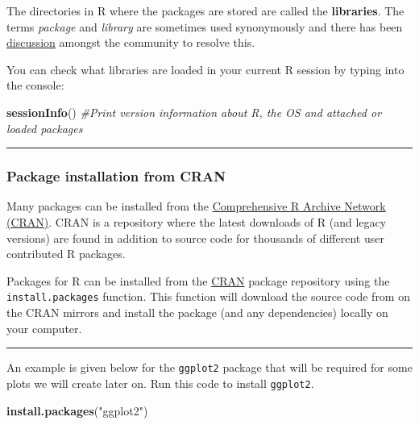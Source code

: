 \documentclass[
]{article}
\newenvironment{Shaded}{\begin{snugshade}}{\end{snugshade}}
\newcommand{\CommentTok}[1]{\textcolor[rgb]{0.56,0.35,0.01}{\textit{#1}}}
\newcommand{\KeywordTok}[1]{\textcolor[rgb]{0.13,0.29,0.53}{\textbf{#1}}}
\newcommand{\NormalTok}[1]{#1}
\newcommand{\StringTok}[1]{\textcolor[rgb]{0.31,0.60,0.02}{#1}}
\begin{document}
The directories in R where the packages are stored are called the
\textbf{libraries}. The terms \emph{package} and \emph{library} are
sometimes used synonymously and there has been
\href{http://www.r-bloggers.com/packages-v-libraries-in-r/}{discussion}
amongst the community to resolve this.

You can check what libraries are loaded in your current R session by
typing into the console:

\begin{Shaded}
\begin{Highlighting}[]
\KeywordTok{sessionInfo}\NormalTok{() }\CommentTok{#Print version information about R, the OS and attached or loaded packages}
\end{Highlighting}
\end{Shaded}

\begin{center}\rule{0.5\linewidth}{0.5pt}\end{center}

\hypertarget{package-installation-from-cran}{%
\subsubsection{Package installation from
CRAN}\label{package-installation-from-cran}}

Many packages can be installed from the
\href{http://cran.r-project.org/}{Comprehensive R Archive Network
(CRAN)}. CRAN is a repository where the latest downloads of R (and
legacy versions) are found in addition to source code for thousands of
different user contributed R packages.

Packages for R can be installed from the
\href{http://cran.r-project.org/}{CRAN} package repository using the
\texttt{install.packages} function. This function will download the
source code from on the CRAN mirrors and install the package (and any
dependencies) locally on your computer.

\begin{center}\rule{0.5\linewidth}{0.5pt}\end{center}

An example is given below for the \texttt{ggplot2} package that will be
required for some plots we will create later on. Run this code to
install \texttt{ggplot2}.

\begin{Shaded}
\begin{Highlighting}[]
\KeywordTok{install.packages}\NormalTok{(}\StringTok{"ggplot2"}\NormalTok{)}
\end{Highlighting}
\end{Shaded}
\end{document}
